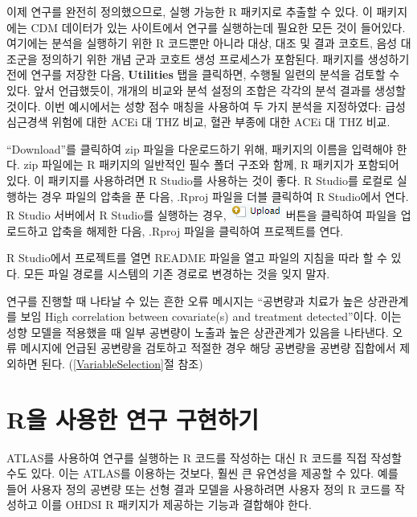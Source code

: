 \documentclass[10.5pt]{book}
\theoremstyle{definition}
\theoremstyle{definition}
\theoremstyle{definition}
\theoremstyle{remark}
\begin{document}
이제 연구를 완전히 정의했으므로, 실행 가능한 R 패키지로 추출할 수 있다.
이 패키지에는 CDM 데이터가 있는 사이트에서 연구를 실행하는데 필요한 모든
것이 들어있다. 여기에는 분석을 실행하기 위한 R 코드뿐만 아니라 대상,
대조 및 결과 코호트, 음성 대조군을 정의하기 위한 개념 군과 코호트 생성
프로세스가 포함된다. 패키지를 생성하기 전에 연구를 저장한 다음,
\textbf{Utilities} 탭을 클릭하면, 수행될 일련의 분석을 검토할 수 있다.
앞서 언급했듯이, 개개의 비교와 분석 설정의 조합은 각각의 분석 결과를
생성할 것이다. 이번 예시에서는 성향 점수 매칭을 사용하여 두 가지 분석을
지정하였다: 급성 심근경색 위험에 대한 ACEi 대 THZ 비교, 혈관 부종에 대한
ACEi 대 THZ 비교.

``Download''를 클릭하여 zip 파일을 다운로드하기 위해, 패키지의 이름을
입력해야 한다. zip 파일에는 R 패키지의 일반적인 필수 폴더 구조와 함께, R
패키지가 포함되어 있다. \citep{Wickham_2015} 이 패키지를 사용하려면 R
Studio를 사용하는 것이 좋다. R Studio를 로컬로 실행하는 경우 파일의
압축을 푼 다음, .Rproj 파일을 더블 클릭하여 R Studio에서 연다. R Studio
서버에서 R Studio를 실행하는 경우,
\includegraphics{images/PopulationLevelEstimation/upload.png} 버튼을
클릭하여 파일을 업로드하고 압축을 해제한 다음, .Rproj 파일을 클릭하여
프로젝트를 연다.

R Studio에서 프로젝트를 열면 README 파일을 열고 파일의 지침을 따라 할 수
있다. 모든 파일 경로를 시스템의 기존 경로로 변경하는 것을 잊지 말자.

연구를 진행할 때 나타날 수 있는 흔한 오류 메시지는 ``공변량과 치료가
높은 상관관계를 보임 High correlation between covariate(s) and treatment
detected''이다. 이는 성향 모델을 적용했을 때 일부 공변량이 노출과 높은
상관관계가 있음을 나타낸다. 오류 메시지에 언급된 공변량을 검토하고
적절한 경우 해당 공변량을 공변량 집합에서 제외하면 된다.
(\ref{VariableSelection}절 참조) 

\section{R을 사용한 연구 구현하기}\label{pleR}

ATLAS를 사용하여 연구를 실행하는 R 코드를 작성하는 대신 R 코드를 직접
작성할 수도 있다. 이는 ATLAS를 이용하는 것보다, 훨씬 큰 유연성을 제공할
수 있다. 예를 들어 사용자 정의 공변량 또는 선형 결과 모델을 사용하려면
사용자 정의 R 코드를 작성하고 이를 OHDSI R 패키지가 제공하는 기능과
결합해야 한다.
\end{document}

